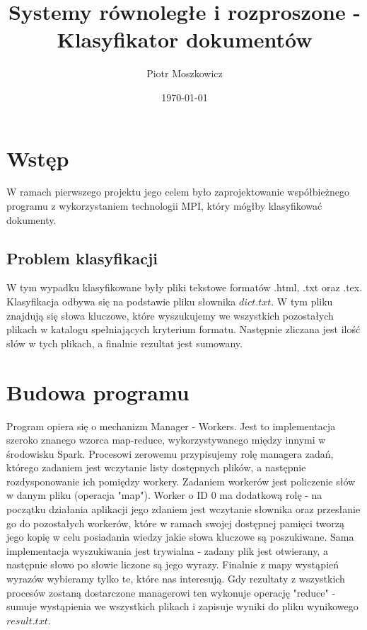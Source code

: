 \documentclass[a4paper,12pt]{article}
\begin{document}
\title{Systemy równoległe i rozproszone - Klasyfikator dokumentów}
\author{Piotr Moszkowicz} 
\date{\today}
\maketitle
{}

\newpage
\begin{justify}
\tableofcontents
\newpage
{}

\section{Wstęp}

W ramach pierwszego projektu jego celem było zaprojektowanie współbieżnego programu z wykorzystaniem technologii MPI, który mógłby klasyfikować dokumenty.

\subsection{Problem klasyfikacji}

W tym wypadku klasyfikowane były pliki tekstowe formatów .html, .txt oraz .tex. Klasyfikacja odbywa się na podstawie pliku słownika $dict.txt$. W tym pliku znajdują się słowa kluczowe, które wyszukujemy we wszystkich pozostałych plikach w katalogu spełniających kryterium formatu. Następnie zliczana jest ilość słów w tych plikach, a finalnie rezultat jest sumowany.

\section{Budowa programu}

Program opiera się o mechanizm Manager - Workers. Jest to implementacja szeroko znanego wzorca map-reduce, wykorzystywanego między innymi w środowisku Spark. Procesowi zerowemu przypisujemy rolę managera zadań, którego zadaniem jest wczytanie listy dostępnych plików, a następnie rozdysponowanie ich pomiędzy workery. Zadaniem workerów jest policzenie słów w danym pliku (operacja "map"). Worker o ID 0 ma dodatkową rolę - na początku działania aplikacji jego zdaniem jest wczytanie słownika oraz przesłanie go do pozostałych workerów, które w ramach swojej dostępnej pamięci tworzą jego kopię w celu posiadania wiedzy jakie słowa kluczowe są poszukiwane. Sama implementacja wyszukiwania jest trywialna - zadany plik jest otwierany, a następnie słowo po słowie liczone są jego wyrazy. Finalnie z mapy wystąpień wyrazów wybieramy tylko te, które nas interesują. Gdy rezultaty z wszystkich procesów zostaną dostarczone managerowi ten wykonuje operację "reduce" - sumuje wystąpienia we wszystkich plikach i zapisuje wyniki do pliku wynikowego $result.txt$. 


\end{justify}
\end{document}
